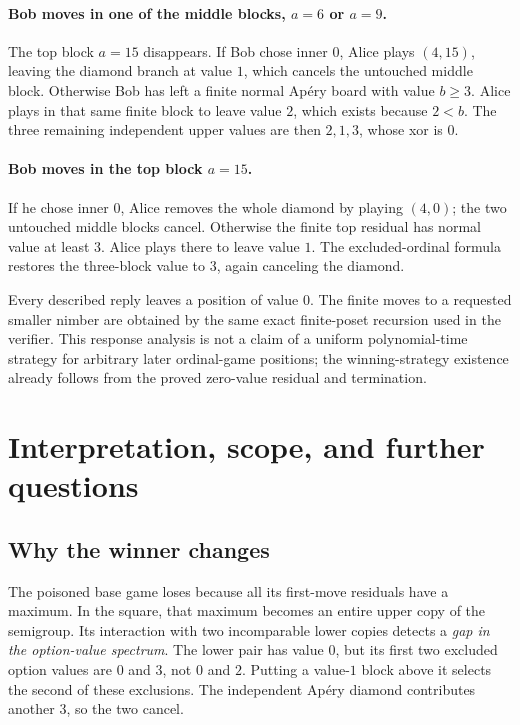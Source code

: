 \documentclass[11pt,letterpaper]{article}
\numberwithin{equation}{section}
\theoremstyle{definition}
\begin{document}
\paragraph{Bob moves in one of the middle blocks, $a=6$ or $a=9$.}
The top block $a=15$ disappears. If Bob chose inner $0$, Alice plays
$(4,15)$, leaving the diamond branch at value $1$, which cancels the
untouched middle block. Otherwise Bob has left a finite normal Ap\'ery
board with value $b\geq3$. Alice plays in that same finite block to leave
value $2$, which exists because $2<b$. The three remaining independent
upper values are then $2,1,3$, whose xor is $0$.

\paragraph{Bob moves in the top block $a=15$.}
If he chose inner $0$, Alice removes the whole diamond by playing $(4,0)$;
the two untouched middle blocks cancel. Otherwise the finite top residual
has normal value at least $3$. Alice plays there to leave value $1$.
The excluded-ordinal formula restores the three-block value to $3$, again
canceling the diamond.

Every described reply leaves a position of value $0$. The finite moves to
a requested smaller nimber are obtained by the same exact finite-poset
recursion used in the verifier. This response analysis is not a claim of a
uniform polynomial-time strategy for arbitrary later ordinal-game
positions; the winning-strategy existence already follows from the proved
zero-value residual and termination.

\section{Interpretation, scope, and further questions}
\label{sec:scope}

\subsection{Why the winner changes}

The poisoned base game loses because all its first-move residuals have a
maximum. In the square, that maximum becomes an entire upper copy of the
semigroup. Its interaction with two incomparable lower copies detects a
\emph{gap in the option-value spectrum}. The lower pair has value $0$, but
its first two excluded option values are $0$ and $3$, not $0$ and $2$.
Putting a value-$1$ block above it selects the second of these exclusions.
The independent Ap\'ery diamond contributes another $3$, so the two cancel.
\end{document}
